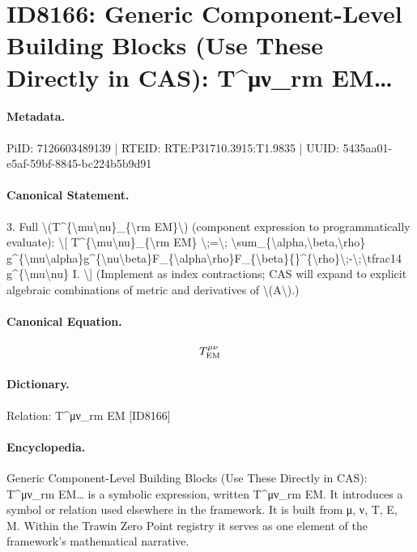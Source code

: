 \section*{ID8166: Generic Component-Level Building Blocks (Use These Directly in CAS): T\textasciicircum{}μν\_rm EM…}
\paragraph{Metadata.}
PiID: 7126603489139 | RTEID: RTE:P31710.3915:T1.9835 | UUID: 5435aa01-e5af-59bf-8845-bc224b5b9d91

\paragraph{Canonical Statement.}
3. Full \textbackslash{}(T\textasciicircum{}\{\textbackslash{}mu\textbackslash{}nu\}\_\{\textbackslash{}rm EM\}\textbackslash{}) (component expression to programmatically evaluate): \textbackslash{}[ T\textasciicircum{}\{\textbackslash{}mu\textbackslash{}nu\}\_\{\textbackslash{}rm EM\} \textbackslash{};=\textbackslash{}; \textbackslash{}sum\_\{\textbackslash{}alpha,\textbackslash{}beta,\textbackslash{}rho\} g\textasciicircum{}\{\textbackslash{}mu\textbackslash{}alpha\}g\textasciicircum{}\{\textbackslash{}nu\textbackslash{}beta\}F\_\{\textbackslash{}alpha\textbackslash{}rho\}F\_\{\textbackslash{}beta\}\{\}\textasciicircum{}\{\textbackslash{}rho\}\textbackslash{};-\textbackslash{};\textbackslash{}tfrac14 g\textasciicircum{}\{\textbackslash{}mu\textbackslash{}nu\} I. \textbackslash{}] (Implement as index contractions; CAS will expand to explicit algebraic combinations of metric and derivatives of \textbackslash{}(A\textbackslash{}).)

\paragraph{Canonical Equation.}
\[
T^{\mu\nu}_{\rm EM}
\]

\paragraph{Dictionary.}
Relation: T\textasciicircum{}μν\_rm EM [ID8166]

\paragraph{Encyclopedia.}
Generic Component-Level Building Blocks (Use These Directly in CAS): T\textasciicircum{}μν\_rm EM… is a symbolic expression, written T\textasciicircum{}μν\_rm EM. It introduces a symbol or relation used elsewhere in the framework. It is built from μ, ν, T, E, M. Within the Trawin Zero Point registry it serves as one element of the framework's mathematical narrative.
